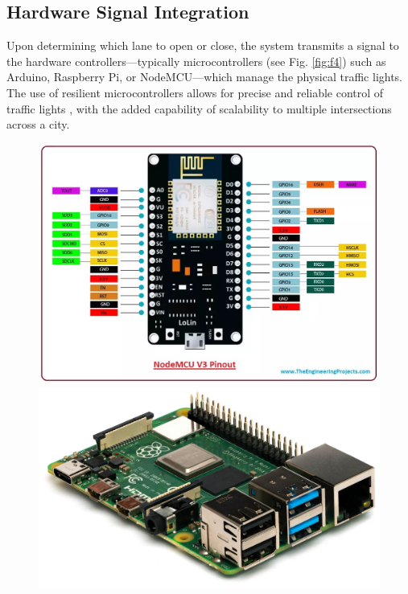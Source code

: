 \documentclass[conference]{IEEEtran}
\begin{document}
\subsection{Hardware Signal Integration}
Upon determining which lane to open or close, the system transmits a signal to the hardware controllers—typically microcontrollers (see Fig. \ref{fig:f4}) such as Arduino, Raspberry Pi, or NodeMCU—which manage the physical traffic lights. The use of resilient microcontrollers allows for precise and reliable control of traffic lights \citep{clar:a12} \citep{clar:a13}, with the added capability of scalability to multiple intersections across a city.
\begin{figure}[H]  %
    \centering
    \begin{minipage}[b]{0.16\textwidth}
        \centering
        \includegraphics[width=\textwidth]{3.jpeg}
    \end{minipage}
    \hspace{0.01\textwidth} %
    \begin{minipage}[b]{0.16\textwidth}
        \centering
        \includegraphics[width=\textwidth]{4.jpg}

\end{minipage}
\end{figure}
\end{document}
